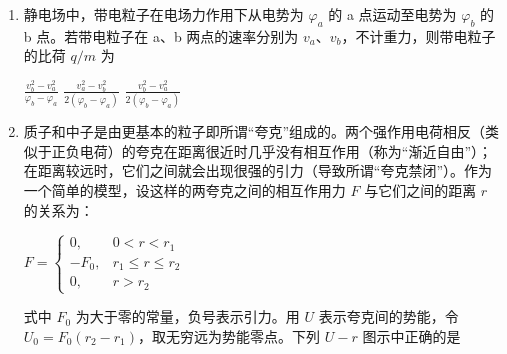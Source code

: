 \documentclass[\gkver]{gaokaozhenti}
\begin{document}
\begin{enumerate}

{重力对小球不做功}
{绳的张力对小球不做功}
{在任何一段时间内，小球克服摩擦力所做的功总是等于小球动能的减少}


\item
静电场中，带电粒子在电场力作用下从电势为 $\varphi_{a}$ 的 a 点运动至电势为 $\varphi_{b}$ 的 b 点。若带电粒子在 a、b 两点的速率分别为 $v_{a}$、$v_{b}$，不计重力，则带电粒子的比荷 $q/m$ 为

{$\frac{v_{b}^{2}-v_{a}^{2}}{\varphi_{b}-\varphi_{a}}$}
{$\frac{v_{a}^{2}-v_{b}^{2}}{2(\varphi_{b}-\varphi_{a})}$}
{$\frac{v_{b}^{2}-v_{a}^{2}}{2(\varphi_{b}-\varphi_{a})}$}


\item
质子和中子是由更基本的粒子即所谓“夸克”组成的。两个强作用电荷相反（类似于正负电荷）的夸克在距离很近时几乎没有相互作用（称为“渐近自由”）；在距离较远时，它们之间就会出现很强的引力（导致所谓“夸克禁闭”）。作为一个简单的模型，设这样的两夸克之间的相互作用力 $F$ 与它们之间的距离 $r$ 的关系为：

$F=\left\{\begin{array}{ll}0, & 0<r<r_{1}\\ -F_{0}, & r_{1}\leqslant r\leqslant r_{2}\\ 0, & r>r_{2}\end{array}\right.$

式中 $F_{0}$ 为大于零的常量，负号表示引力。用 $U$ 表示夸克间的势能，令 $U_{0}=F_{0}(r_{2}-r_{1})$，取无穷远为势能零点。下列 $U-r$ 图示中正确的是


\end{enumerate}
\end{document}
